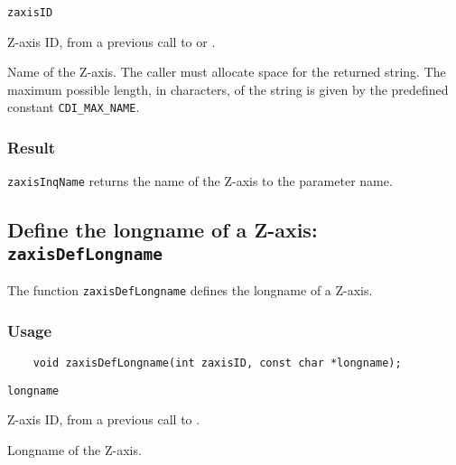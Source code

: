 \hspace*{4mm}\begin{minipage}[]{15cm}
\begin{deflist}{\tt zaxisID\ }
\item[{\tt zaxisID}]
Z-axis ID, from a previous call to {} or {}.
\item[{\tt name}]
Name of the Z-axis. The caller must allocate space for the
                    returned string. The maximum possible length, in characters, of
                    the string is given by the predefined constant {\tt CDI\_MAX\_NAME}.

\end{deflist}
\end{minipage}

\subsubsection*{Result}

{\tt zaxisInqName} returns the name of the Z-axis to the parameter name.



\subsection{Define the longname of a Z-axis: {\tt zaxisDefLongname}}
\label{zaxisDefLongname}

The function {\tt zaxisDefLongname} defines the longname of a Z-axis.

\subsubsection*{Usage}

\begin{verbatim}
    void zaxisDefLongname(int zaxisID, const char *longname);
\end{verbatim}

\hspace*{4mm}\begin{minipage}[]{15cm}
\begin{deflist}{\tt longname\ }
\item[{\tt zaxisID}]
Z-axis ID, from a previous call to {}.
\item[{\tt longname}]
Longname of the Z-axis.

\end{deflist}
\end{minipage}


